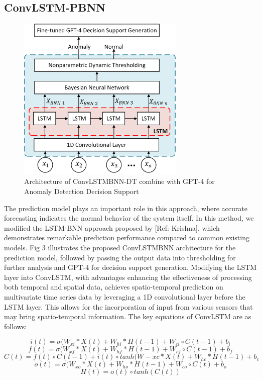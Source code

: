 \documentclass[final,3p,times,twocolumn]{elsarticle}
\begin{document}
\subsection{ConvLSTM-PBNN}
\begin{figure}[h]
	\includegraphics[width=8cm]{ConvLSTMBNNDT} 
	\caption{Architecture of ConvLSTMBNN-DT combine with GPT-4 for Anomaly Detection Decision Support}\label{fig:ConvLSTMBNNDT}
\end{figure}
The prediction model plays an important role in this approach, where accurate forecasting indicates the normal behavior of the system itself. In this method, we modified the LSTM-BNN approach proposed by [Ref: Krishna], which demonstrates remarkable prediction performance compared to common existing models. Fig 3 illustrates the proposed ConvLSTMBNN architecture for the prediction model, followed by passing the output data into thresholding for further analysis and GPT-4 for decision support generation. Modifying the LSTM layer into ConvLSTM, with advantages enhancing the effectiveness of processing both temporal and spatial data, achieves spatio-temporal prediction on multivariate time series data by leveraging a 1D convolutional layer before the LSTM layer. This allows for the incorporation of input from various sensors that may bring spatio-temporal information. The key equations of ConvLSTM are as follows:

\begin{equation}
i(t) = \sigma(W_{xi} \ast X(t) + W_{hi} \ast H(t-1) + W_{ci} \circ C(t-1) + b_i
\label{eq:a}
\end{equation}
\begin{equation}
f(t) = \sigma(W_{xf} \ast X(t) + W_{hf} \ast H(t-1) + W_{cf} \circ C(t-1) + b_f
\label{eq:b}
\end{equation}
\begin{equation}
C(t) = f(t) \circ C(t-1) + i(t) \circ tanh(W-{xc} \ast X(t) + W_{hc} \ast H(t-1) + b_c
\label{eq:c}
\end{equation}
\begin{equation}
o(t) = \sigma(W_{xo} \ast X(t) + W_{ho} \ast H(t-1) + W_{co} \circ C(t) + b_o
\label{eq:d}
\end{equation}
\begin{equation}
H(t) = o(t) \circ tanh(C(t))
\label{eq:e}
\end{equation}
\end{document}
